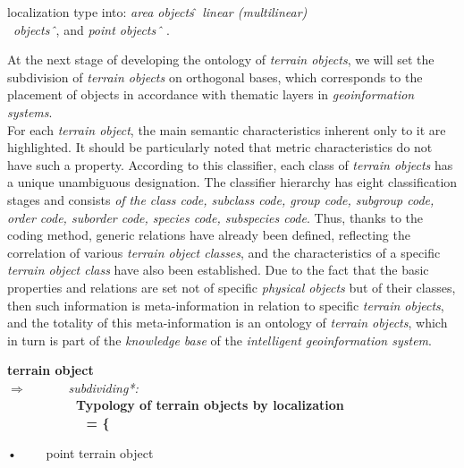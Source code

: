 \documentclass{article}
\begin{document}
\begin{multicols}{2}

\begin{tabbing}
	\hspace{-0.17cm} localization type into:\textit{ area objects\^\,\ linear (multilinear)}\\ \ \textit{objects\^\ }, and \textit{point objects\^\ } .
\end{tabbing}
          At the next stage of developing the ontology of
\textit{terrain objects}, we will set the subdivision of \textit{terrain
objects} on orthogonal bases, which corresponds to the
placement of objects in accordance with thematic layers
in \textit{geoinformation systems}.
\ \\

For each \textit{terrain object}, the main semantic characteristics inherent only 
to it are highlighted. It should be
particularly noted that metric characteristics do not have
such a property. According to this classifier, each class
of \textit{terrain objects} has a unique unambiguous designation.
The classifier hierarchy has eight classification stages and
consists \textit{of the class code, subclass code, group code,
subgroup code, order code, suborder code, species code,
subspecies code}. Thus, thanks to the coding method,
generic relations have already been defined, reflecting
the correlation of various \textit{terrain object classes}, and the
characteristics of a specific \textit{terrain object class} have also
been established. Due to the fact that the basic properties
and relations are set not of specific \textit{physical objects} but of
their classes, then such information is meta-information in
relation to specific \textit{terrain objects}, and the totality of this
meta-information is an ontology of \textit{terrain objects}, which
in turn is part of the \textit{knowledge base} of the \textit{intelligent
geoinformation system}.
\begin{tabbing}
\hspace{0cm}\textbf{terrain object}\\
 \(\Rightarrow\) \ \ \ \ \ \   \textit{subdividing*:}\\
 \ \ \ \ \ \ \ \ \ \ \ \textbf{Typology of terrain objects by localization\^\\ \ \ \ \ \ \ \ \ \ \ \  =  \{ }
\end{tabbing}
\begin{adjustwidth}{15mm}{}
 \begin{itemize}  
 •  \ \ \ \     point terrain object

\end{itemize}
\end{adjustwidth}
\end{multicols}
\end{document}
